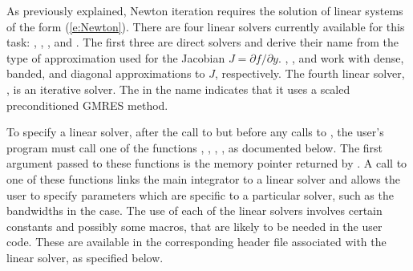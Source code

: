 As previously explained, Newton iteration requires the solution of
linear systems of the form (\ref{e:Newton}).  There are four {\cvodes} linear
solvers currently available for this task: {\cvdense}, {\cvband}, {\cvdiag},
and {\cvspgmr}.  The first three are direct solvers and derive their name
from the type of approximation used for the Jacobian 
$J = \partial{f}/\partial{y}$.  {\cvdense}, {\cvband}, and {\cvdiag} work with
dense, banded, and diagonal approximations to $J$, respectively.  The
fourth {\cvodes} linear solver, {\cvspgmr}, is an iterative solver.  The {\spgmr}
in the name indicates that it uses a scaled preconditioned
GMRES method.

To specify a {\cvodes} linear solver, after the call to 
but before any calls to , the user's program must call one
of the functions , , , ,
as documented below. The first argument passed to these functions is the {\cvodes}
memory pointer returned by .  A call to one of these
functions links the main {\cvodes} integrator to a linear solver and
allows the user to specify parameters which are specific to a
particular solver, such as the bandwidths in the {\cvband} case.
The use of each of the linear solvers involves certain constants and possibly 
some macros, that are likely to be needed in the user code.  These are
available in the corresponding header file associated with the linear
solver, as specified below.

